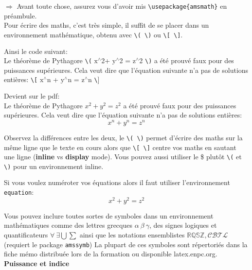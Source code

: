 \documentclass[11pt]{article}				%
\newcommand{\tb}{\textbackslash}
\newcommand{\cmd}[2]{\texttt{\textbackslash #1}\texttt{\{#2\}}}
\begin{document}
$\Rightarrow$ Avant toute chose, assurez vous d'avoir mis \cmd{usepackage}{amsmath} en préambule.\\

Pour écrire des maths, c'est très simple, il suffit de se placer dans un environnement mathématique, obtenu avec \texttt{\tb( \tb)} ou \texttt{\tb[ \tb]}. 

\begin{multicols}{2}
Ainsi le code suivant:\\
\textsf{Le théorème de Pythagore \texttt{\tb(} $\text{x}^{\wedge}$2+ $\text{y}^{\wedge}$2 = $\text{z}^{\wedge}$2 \texttt{\tb)} a été prouvé faux pour des puissances supérieures. Cela veut dire que l'équation suivante n'a pas de solutions entières:
	 \texttt{\tb[} $\text{x}^{\wedge}$n + $\text{y}^{\wedge}$n = $\text{z}^{\wedge}$n \texttt{\tb}] }
	
	\columnbreak
	
	Devient sur le pdf:\\	
	Le théorème de Pythagore $x^2 + y^2 = z^2$ a été prouvé faux pour des puissances supérieures. Cela veut dire que l'équation suivante n'a pas de solutions entières: \[ x^n + y^n = z^n \]
	
	
	
\end{multicols}
\clearpage
Observez la différences entre les deux, le \texttt{\tb( \tb)} permet d'écrire des maths sur la même ligne que le texte en cours alors que \texttt{\tb[ \tb]} centre vos maths en sautant une ligne (\textbf{inline} vs \textbf{display} mode). Vous pouvez aussi utiliser le \$ plutôt \texttt{\tb(} et \texttt{\tb)} pour un environnement inline.

Si vous voulez numéroter vos équations alors il faut utiliser l'environnement \texttt{equation}:
\begin{equation}
x^2 +y^2 = z^2
\end{equation}

Vous pouvez inclure toutes sortes de symboles dans un environnement mathématiques comme des lettres grecques $\alpha \ \beta \ \gamma$, des signes logiques et quantificateurs $\forall \ \exists \bigcup \sum$ ainsi que les notations ensemblistes $\mathbb{RQSZ}, \mathcal{CBTL}$ (requiert le package \verb|amssymb|) La plupart de ces symboles sont répertoriés dans la fiche mémo distribuée lors de la formation ou disponible latex.enpc.org.\\

\textbf{Puissance et indice}\\
\end{document}
